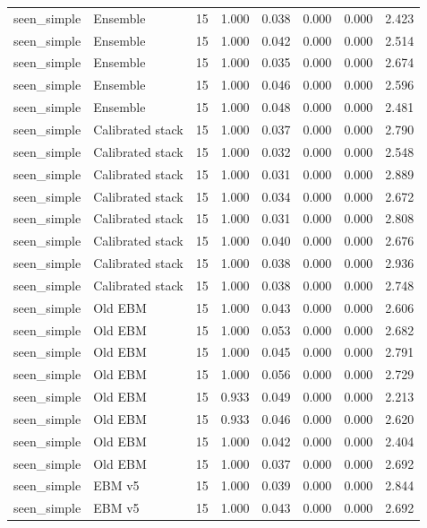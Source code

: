 {\begin{longtable}{llrrrrrr}
seen\_simple & Ensemble & 15 & 1.000 & 0.038 & 0.000 & 0.000 & 2.423 \\
seen\_simple & Ensemble & 15 & 1.000 & 0.042 & 0.000 & 0.000 & 2.514 \\
seen\_simple & Ensemble & 15 & 1.000 & 0.035 & 0.000 & 0.000 & 2.674 \\
seen\_simple & Ensemble & 15 & 1.000 & 0.046 & 0.000 & 0.000 & 2.596 \\
seen\_simple & Ensemble & 15 & 1.000 & 0.048 & 0.000 & 0.000 & 2.481 \\
seen\_simple & Calibrated stack & 15 & 1.000 & 0.037 & 0.000 & 0.000 & 2.790 \\
seen\_simple & Calibrated stack & 15 & 1.000 & 0.032 & 0.000 & 0.000 & 2.548 \\
seen\_simple & Calibrated stack & 15 & 1.000 & 0.031 & 0.000 & 0.000 & 2.889 \\
seen\_simple & Calibrated stack & 15 & 1.000 & 0.034 & 0.000 & 0.000 & 2.672 \\
seen\_simple & Calibrated stack & 15 & 1.000 & 0.031 & 0.000 & 0.000 & 2.808 \\
seen\_simple & Calibrated stack & 15 & 1.000 & 0.040 & 0.000 & 0.000 & 2.676 \\
seen\_simple & Calibrated stack & 15 & 1.000 & 0.038 & 0.000 & 0.000 & 2.936 \\
seen\_simple & Calibrated stack & 15 & 1.000 & 0.038 & 0.000 & 0.000 & 2.748 \\
seen\_simple & Old EBM & 15 & 1.000 & 0.043 & 0.000 & 0.000 & 2.606 \\
seen\_simple & Old EBM & 15 & 1.000 & 0.053 & 0.000 & 0.000 & 2.682 \\
seen\_simple & Old EBM & 15 & 1.000 & 0.045 & 0.000 & 0.000 & 2.791 \\
seen\_simple & Old EBM & 15 & 1.000 & 0.056 & 0.000 & 0.000 & 2.729 \\
seen\_simple & Old EBM & 15 & 0.933 & 0.049 & 0.000 & 0.000 & 2.213 \\
seen\_simple & Old EBM & 15 & 0.933 & 0.046 & 0.000 & 0.000 & 2.620 \\
seen\_simple & Old EBM & 15 & 1.000 & 0.042 & 0.000 & 0.000 & 2.404 \\
seen\_simple & Old EBM & 15 & 1.000 & 0.037 & 0.000 & 0.000 & 2.692 \\
seen\_simple & EBM v5 & 15 & 1.000 & 0.039 & 0.000 & 0.000 & 2.844 \\
seen\_simple & EBM v5 & 15 & 1.000 & 0.043 & 0.000 & 0.000 & 2.692 \\

\end{longtable}}
